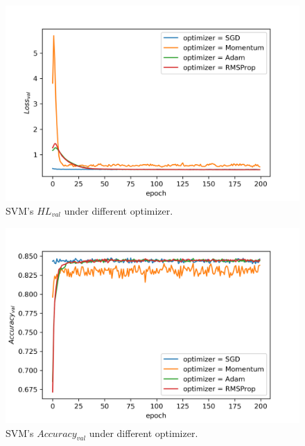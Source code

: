 \documentclass[journal, a4paper]{IEEEtran}
\begin{document}
\begin{figure}[!hbt]
	\begin{center}
		\includegraphics[width=\columnwidth]{svm_optim_val_loss}
		\caption{SVM's $HL_{val}$ under different optimizer.}
		\label{fig:svm_optim_val_loss}
	\end{center}
\end{figure} \par

\begin{figure}[!hbt]
	\begin{center}
		\includegraphics[width=\columnwidth]{svm_optim_val_acc}
		\caption{SVM's $Accuracy_{val}$ under different optimizer.}
		\label{fig:svm_optim_val_acc}
	\end{center}
\end{figure} \par
\end{document}
